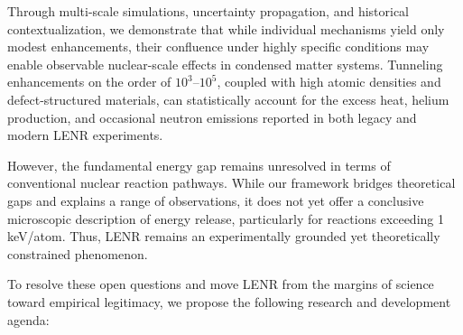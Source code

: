     Through multi-scale simulations, uncertainty propagation, and historical contextualization, we demonstrate that while individual mechanisms yield only modest enhancements, their confluence under highly specific conditions may enable observable nuclear-scale effects in condensed matter systems. Tunneling enhancements on the order of $10^3$–$10^5$, coupled with high atomic densities and defect-structured materials, can statistically account for the excess heat, helium production, and occasional neutron emissions reported in both legacy and modern LENR experiments.
    
    However, the fundamental energy gap remains unresolved in terms of conventional nuclear reaction pathways. While our framework bridges theoretical gaps and explains a range of observations, it does not yet offer a conclusive microscopic description of energy release, particularly for reactions exceeding 1 keV/atom. Thus, LENR remains an experimentally grounded yet theoretically constrained phenomenon.
    
    To resolve these open questions and move LENR from the margins of science toward empirical legitimacy, we propose the following research and development agenda:
    
